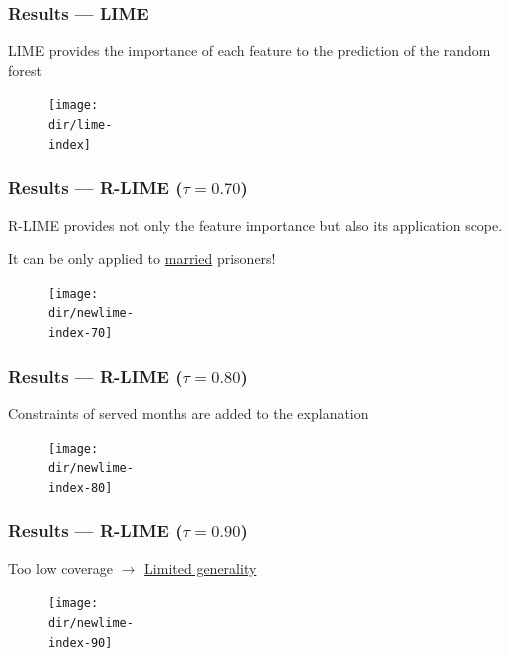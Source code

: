\documentclass[aspectratio=169]{slide-en}
\begin{document}
{%
\def\scale{0.42}

\subsubsection{Results --- LIME}
\begin{frame}{}
  LIME provides the importance of each feature to the prediction of the random forest
  \bigskip
  \begin{figure}[b]
    \hspace{-5em}
    \texttt{[image: \\dir/lime-\\index]}
  \end{figure}
\end{frame}

\subsubsection{Results --- R-LIME ($\tau=0.70$)}
\begin{frame}{}
  R-LIME provides not only the feature importance but also its application scope.

  It can be only applied to \underline{married} prisoners!
  \begin{figure}
    \hspace{-5em}
    \texttt{[image: \\dir/newlime-\\index-70]}
  \end{figure}
\end{frame}

\subsubsection{Results --- R-LIME ($\tau=0.80$)}
\begin{frame}{}
  Constraints of served months are added to the explanation

  \begin{figure}
    \hspace{-4.8em}
    \texttt{[image: \\dir/newlime-\\index-80]}
  \end{figure}
\end{frame}

\subsubsection{Results --- R-LIME ($\tau=0.90$)}
\begin{frame}{}
  Too low coverage $\rightarrow$ \underline{Limited generality}
  \begin{figure}
    \hspace{-2.3em}
    \texttt{[image: \\dir/newlime-\\index-90]}
  \end{figure}
\end{frame}
}
\end{document}
